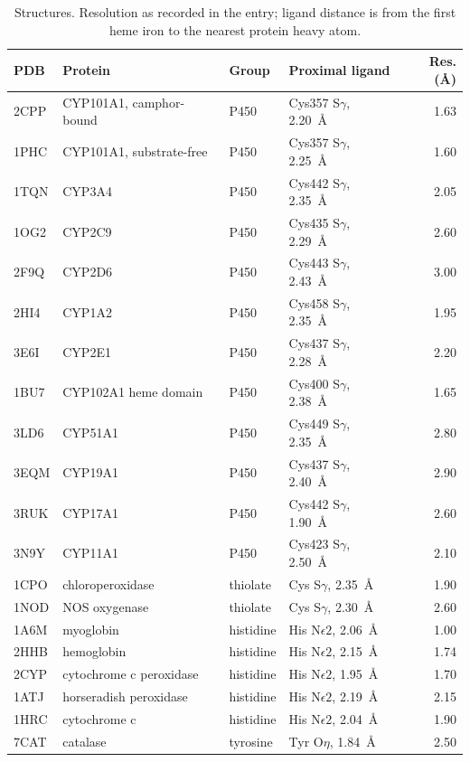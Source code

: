 \documentclass[10pt,twocolumn,a4paper]{article}
\begin{document}
\begin{table}[t]
\centering
\small
\caption{Structures. Resolution as recorded in the entry; ligand distance is
from the first heme iron to the nearest protein heavy atom.}
\label{tab:structures}
\begin{tabular}{@{}llllr@{}}
\toprule
PDB & Protein & Group & Proximal ligand & Res. (\AA)\\
\midrule
2CPP & CYP101A1, camphor-bound & P450 & Cys357 S$\gamma$, 2.20~\AA & 1.63\\
1PHC & CYP101A1, substrate-free & P450 & Cys357 S$\gamma$, 2.25~\AA & 1.60\\
1TQN & CYP3A4 & P450 & Cys442 S$\gamma$, 2.35~\AA & 2.05\\
1OG2 & CYP2C9 & P450 & Cys435 S$\gamma$, 2.29~\AA & 2.60\\
2F9Q & CYP2D6 & P450 & Cys443 S$\gamma$, 2.43~\AA & 3.00\\
2HI4 & CYP1A2 & P450 & Cys458 S$\gamma$, 2.35~\AA & 1.95\\
3E6I & CYP2E1 & P450 & Cys437 S$\gamma$, 2.28~\AA & 2.20\\
1BU7 & CYP102A1 heme domain & P450 & Cys400 S$\gamma$, 2.38~\AA & 1.65\\
3LD6 & CYP51A1 & P450 & Cys449 S$\gamma$, 2.35~\AA & 2.80\\
3EQM & CYP19A1 & P450 & Cys437 S$\gamma$, 2.40~\AA & 2.90\\
3RUK & CYP17A1 & P450 & Cys442 S$\gamma$, 1.90~\AA & 2.60\\
3N9Y & CYP11A1 & P450 & Cys423 S$\gamma$, 2.50~\AA & 2.10\\
1CPO & chloroperoxidase & thiolate & Cys S$\gamma$, 2.35~\AA & 1.90\\
1NOD & NOS oxygenase & thiolate & Cys S$\gamma$, 2.30~\AA & 2.60\\
1A6M & myoglobin & histidine & His N$\epsilon2$, 2.06~\AA & 1.00\\
2HHB & hemoglobin & histidine & His N$\epsilon2$, 2.15~\AA & 1.74\\
2CYP & cytochrome c peroxidase & histidine & His N$\epsilon2$, 1.95~\AA & 1.70\\
1ATJ & horseradish peroxidase & histidine & His N$\epsilon2$, 2.19~\AA & 2.15\\
1HRC & cytochrome c & histidine & His N$\epsilon2$, 2.04~\AA & 1.90\\
7CAT & catalase & tyrosine & Tyr O$\eta$, 1.84~\AA & 2.50\\
\bottomrule
\end{tabular}
\end{table}
\end{document}
